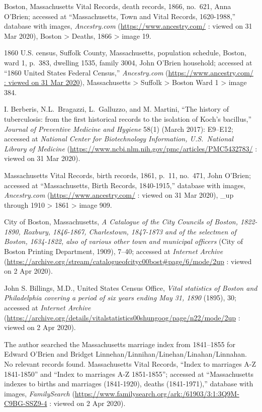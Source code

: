 \begin{thebibliography}{99}
	Boston, Massachusetts Vital Records, death records, 1866, no.\ 621, Anna O'Brien; accessed at ``Massachusetts, Town and Vital Records, 1620-1988,'' database with images, \textit{Ancestry.com} (\url{https://www.ancestry.com/} : viewed on 31 Mar 2020), Boston > Deaths, 1866 > image 19.
	
	1860 U.S. census, Suffolk County, Massachusetts, population schedule, Boston, ward 1, p.\ 383, dwelling 1535, family 3004, John O'Brien household; accessed at ``1860 United States Federal Census,'' \textit{Ancestry.com} (\url{https://www.ancestry.com/ : viewed on 31 Mar 2020}), Massachusetts > Suffolk > Boston Ward 1 > image 384.
	
	I. Berberis, N.L.\ Bragazzi, L.\ Galluzzo, and M. Martini, ``The history of tuberculosis: from the first historical records to the isolation of Koch's bacillus,'' \textit{Journal of Preventive Medicine and Hygiene} 58(1) (March 2017): E9--E12; accessed at \textit{National Center for Biotechnology Information, U.S.\ National Library of Medicine} (\url{https://www.ncbi.nlm.nih.gov/pmc/articles/PMC5432783/} : viewed on 31 Mar 2020).
	
	Massachusetts Vital Records, birth records, 1861, p.\ 11, no.\ 471, John O'Brien; accessed at ``Massachusetts, Birth Records, 1840-1915,'' database with images, \textit{Ancestry.com} (\url{https://www.ancestry.com/} : viewed on 31 Mar 2020), \_up through 1910 > 1861 > image 909.
	
	City of Boston, Massachusetts, \textit{A Catalogue of the City Councils of Boston, 1822-1890, Roxbury, 1846-1867, Charlestown, 1847-1873 and of the selectmen of Boston, 1634-1822, also of various other town and municipal officers} (City of Boston Printing Department, 1909), 7--40; accessed at \textit{Internet Archive} (\url{https://archive.org/stream/catalogueofcityc00bost#page/6/mode/2up} : viewed on 2 Apr 2020).
	
	John S. Billings, M.D., United States Census Office, \textit{Vital statistics of Boston and Philadelphia covering a period of six years ending May 31, 1890} (1895), 30; accessed at \textit{Internet Archive} (\url{https://archive.org/details/vitalstatistics00shungoog/page/n22/mode/2up} : viewed on 2 Apr 2020). 
	
	The author searched the Massachusetts marriage index from 1841--1855 for Edward O'Brien and Bridget Linnehan/Linnihan/Linehan/Linahan/Linnahan. No relevant records found.	
	Massachusetts Vital Records, ``Index to marriages A-Z 1841-1850'' and ``Index to marriages A-Z 1851-1855''; accessed at ``Massachusetts indexes to births and marriages (1841-1920), deaths (1841-1971),'' database with images, \textit{FamilySearch} (\url{https://www.familysearch.org/ark:/61903/3:1:3Q9M-C9BG-SSZ9-4} : viewed on 2 Apr 2020).
	

\end{thebibliography}
